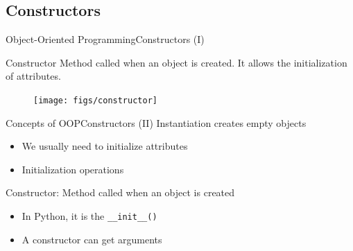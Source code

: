 \documentclass[10pt,compress]{beamer} %
\begin{document}
\subsection{Constructors}

\begin{frame}{Object-Oriented Programming}{Constructors (I)}
	\begin{block}{Constructor}
		 Method called when an object is created. It allows the initialization of attributes. 
  	\end{block}	
		\begin{figure}
			\texttt{[image: figs/constructor]}
		\end{figure}				
\end{frame}

\begin{frame}{Concepts of OOP}{Constructors (II)}
		Instantiation creates empty objects
		\begin{itemize}
			\item We usually need to initialize attributes
			\item Initialization operations
		\end{itemize}
		\alert{Constructor}: Method called when an object is created
		\begin{itemize}
			\item In Python, it is the \texttt{\_\_init\_\_()}
			\item A constructor can get arguments
		\end{itemize}
\end{frame}

%		
\end{document}
